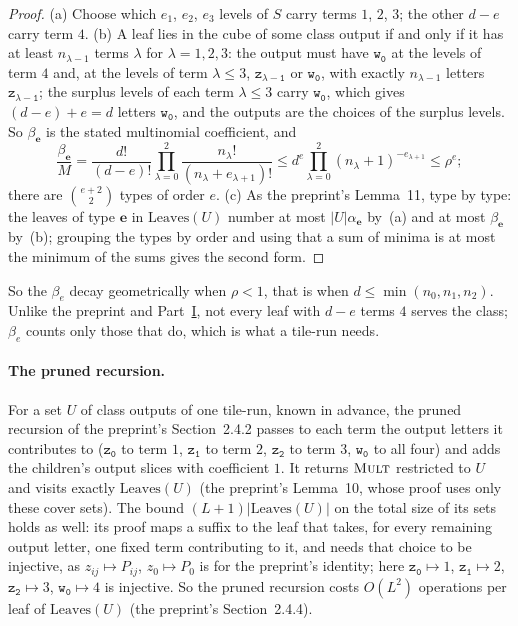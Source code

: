 \documentclass[11pt]{article}
\theoremstyle{definition}
\theoremstyle{remark}
\newcommand{\Leaves}{\mathrm{Leaves}}
\newcommand{\Mult}{\textnormal{\textsc{Mult}}}
\newcommand{\tl}[1]{\mathtt{#1}}
\begin{document}
\begin{proof}
(a) Choose which $e_1$, $e_2$, $e_3$ levels of $S$ carry terms $1$, $2$, $3$; the other $d-e$ carry term $4$. (b) A leaf lies in the cube of some class output if and only if it has at least $n_{\lambda-1}$ terms $\lambda$ for $\lambda=1,2,3$: the output must have $\tl{w_0}$ at the levels of term $4$ and, at the levels of term $\lambda\le3$, $\tl{z_{\lambda-1}}$ or $\tl{w_0}$, with exactly $n_{\lambda-1}$ letters $\tl{z_{\lambda-1}}$; the surplus levels of each term $\lambda\le3$ carry $\tl{w_0}$, which gives $(d-e)+e=d$ letters $\tl{w_0}$, and the outputs are the choices of the surplus levels. So $\beta_{\mathbf e}$ is the stated multinomial coefficient, and
\[
\frac{\beta_{\mathbf e}}M=\frac{d!}{(d-e)!}\prod_{\lambda=0}^2\frac{n_\lambda!}{(n_\lambda+e_{\lambda+1})!}\le d^e\prod_{\lambda=0}^2(n_\lambda+1)^{-e_{\lambda+1}}\le\rho^e;
\]
there are $\binom{e+2}2$ types of order $e$. (c) As the preprint's Lemma~11, type by type: the leaves of type $\mathbf e$ in $\Leaves(U)$ number at most $|U|\alpha_{\mathbf e}$ by~(a) and at most $\beta_{\mathbf e}$ by~(b); grouping the types by order and using that a sum of minima is at most the minimum of the sums gives the second form.
\end{proof}

So the $\beta_e$ decay geometrically when $\rho<1$, that is when $d\le\min(n_0,n_1,n_2)$. Unlike the preprint and Part~\hyperref[m:partI]{I}, not every leaf with $d-e$ terms $4$ serves the class; $\beta_e$ counts only those that do, which is what a tile-run needs.

\paragraph{The pruned recursion.} For a set $U$ of class outputs of one tile-run, known in advance, the pruned recursion of the preprint's Section~2.4.2 passes to each term the output letters it contributes to ($\tl{z_0}$ to term $1$, $\tl{z_1}$ to term $2$, $\tl{z_2}$ to term $3$, $\tl{w_0}$ to all four) and adds the children's output slices with coefficient $1$. It returns $\Mult$ restricted to $U$ and visits exactly $\Leaves(U)$ (the preprint's Lemma~10, whose proof uses only these cover sets). The bound $(L+1)|\Leaves(U)|$ on the total size of its sets holds as well: its proof maps a suffix to the leaf that takes, for every remaining output letter, one fixed term contributing to it, and needs that choice to be injective, as $z_{ij}\mapsto P_{ij}$, $z_0\mapsto P_0$ is for the preprint's identity; here $\tl{z_0}\mapsto1$, $\tl{z_1}\mapsto2$, $\tl{z_2}\mapsto3$, $\tl{w_0}\mapsto4$ is injective. So the pruned recursion costs $O(L^2)$ operations per leaf of $\Leaves(U)$ (the preprint's Section~2.4.4).
\end{document}
